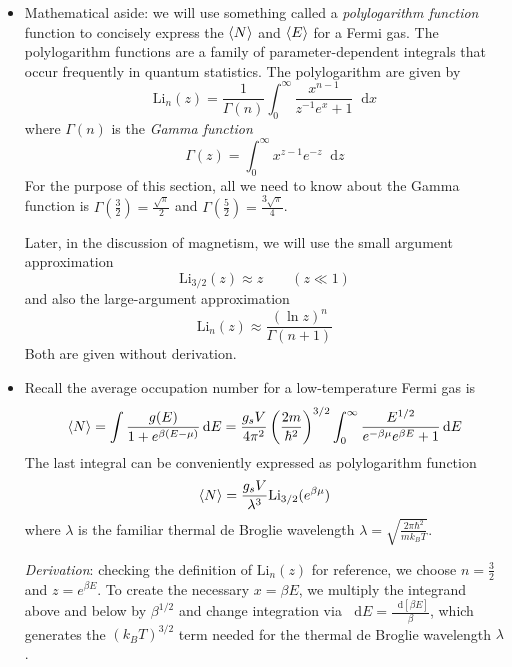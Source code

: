 \documentclass[11pt, a4paper]{article}
\newcommand{\diff}{\mathop{}\!\mathrm{d}} %
\begin{document}
\begin{itemize}
	\item Mathematical aside: we will use something called a \textit{polylogarithm function} function to concisely express the $ \expval{N} $ and $ \expval{E} $ for a Fermi gas. The polylogarithm functions are a family of parameter-dependent integrals that occur frequently in quantum statistics. The polylogarithm are given by
	\begin{equation*}
		\mathrm{Li}_{n}(z) = \frac{1}{\Gamma(n)} \int_{0}^{\infty} \frac{x^{n-1}}{z^{-1}e^{x}+1} \diff x
	\end{equation*}
	where $ \Gamma(n) $ is the \textit{Gamma function} 
	\begin{equation*}
		\Gamma(z) = \int_{0}^{\infty} x^{z-1}e^{-z}\diff z
	\end{equation*}
	For the purpose of this section, all we need to know about the Gamma function is $ \Gamma(\frac{3}{2}) = \frac{\sqrt{\pi}}{2} $ and $ \Gamma(\frac{5}{2}) = \frac{3\sqrt{\pi}}{4} $.

	Later, in the discussion of magnetism, we will use the small argument approximation
	\begin{equation*}
		\mathrm{Li}_{3/2}(z) \approx z \qquad (z \ll 1)
	\end{equation*}
	and also the large-argument approximation
	\begin{equation*}
		\mathrm{Li}_{n}(z) \approx \frac{(\ln z)^{n}}{\Gamma(n+1)} 
	\end{equation*}
	Both are given without derivation.
	
	\item Recall the average occupation number for a low-temperature Fermi gas is
	\begin{equation*}
		\expval{N} = \int  \frac{g(E)}{1 + e^{\beta (E - \mu)}}  \diff E = \frac{g_{s}V}{4\pi^{2}} \left(\frac{2m}{\hbar^{2}}\right)^{3/2} \int_{0}^{\infty}\frac{E^{1/2}}{e^{-\beta \mu} e^{\beta E} + 1} \diff E 
	\end{equation*}
	The last integral can be conveniently expressed as polylogarithm function
	\begin{equation*}
		\expval{N} = \frac{g_{s}V}{\lambda^{3}}\mathrm{Li}_{3/2}(e^{\beta \mu})
	\end{equation*}
	where $ \lambda $ is the familiar thermal de Broglie wavelength $ \lambda = \sqrt{\frac{2\pi \hbar^{2}}{mk_{B}T}} $.
	
	\textit{Derivation}: checking the definition of $ \mathrm{Li}_{n}(z) $ for reference, we choose $ n = \frac{3}{2} $ and $ z = e^{\beta E} $. To create the necessary $ x = \beta E $, we multiply the integrand above and below by $ \beta^{1/2} $ and change integration via $ \diff E =  \frac{\diff[\beta E]}{\beta}  $, which generates the $ (k_{B}T)^{3/2} $ term needed for the thermal de Broglie wavelength $ \lambda $.
	

\end{itemize}
\end{document}
